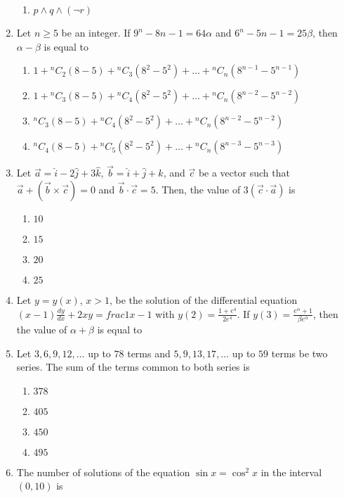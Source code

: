 \documentclass[journal,12pt,onecolumn]{IEEEtran}
\theoremstyle{remark}
\begin{document}
\begin{enumerate}
\begin{enumerate}
    \item $p \land q \land (\neg r)$
\end{enumerate}
\item Let $n \geq 5$ be an integer. If $9^n - 8n - 1 = 64 \alpha$ and $6^n - 5n - 1 = 25 \beta$, then $\alpha - \beta$ is equal to
\begin{enumerate}
    \item $1 + {^{n}C_2} (8 - 5) + {^{n}C_3} (8^2 - 5^2) + \ldots + {^{n}C_n} (8^{n-1} - 5^{n-1})$
    \item $1 + {^{n}C_3} (8 - 5) + {^{n}C_4} (8^2 - 5^2) + \ldots + {^{n}C_n} (8^{n-2} - 5^{n-2})$
    \item ${^{n}C_3} (8 - 5) + {^{n}C_4} (8^2 - 5^2) + \ldots + {^{n}C_n} (8^{n-2} - 5^{n-2})$
    \item ${^{n}C_4} (8 - 5) + {^{n}C_5} (8^2 - 5^2) + \ldots + {^{n}C_n} (8^{n-3} - 5^{n-3})$
\end{enumerate}
\item Let $\vec{a} = \hat{i} - 2\hat{j} + 3\hat{k}$, $\vec{b} = \hat{i} + \hat{j} + \hat{k}$, and $\vec{c}$ be a vector such that 
$\vec{a} + \left( \vec{b} \times \vec{c} \right) = 0$ and $\vec{b} \cdot \vec{c} = 5$. Then, the value of $3 \left( \vec{c} \cdot \vec{a} \right)$ is
\begin{enumerate}
    \item $10$
    \item $15$
    \item $20$
    \item $25$
\end{enumerate}
\item Let $y = y(x)$, $x > 1$, be the solution of the differential equation 
$(x - 1) \frac{dy}{dx} + 2xy = frac{1}{x - 1}$ with $y(2) = \frac{1 + e^4}{2e^4}$.
If $y(3) = \frac{e^\alpha + 1}{\beta e^\alpha}$, then the value of $\alpha + \beta$ is equal to
\item Let $3, 6, 9, 12, \dots$ up to $78$ terms and $5, 9, 13, 17, \dots$ up to $59$ terms be two series. The sum of the terms common to both series is
\begin{enumerate}
    \item $378$
    \item $405$
    \item $450$
    \item $495$
\end{enumerate}
\item The number of solutions of the equation $\sin x = \cos^2 x$ in the interval $(0, 10)$ is
\begin{enumerate}

\end{enumerate}
\end{enumerate}
\end{document}
